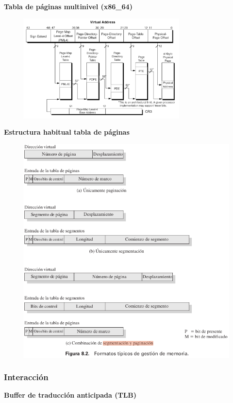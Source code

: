 \documentclass{article}
\begin{document}
\textbf{Tabla de páginas multinivel (x86\_64)}
\begin{figure}[h]
\centering
\includegraphics[scale=1,width=85mm]{tabla_multinivel.png}
\end{figure}

\newpage

\textbf{Estructura habitual tabla de páginas}
\begin{figure}[h]
\centering
\includegraphics[scale=1,width=\textwidth]{estructuratabla.png}
\end{figure}

\subsubsection{Interacción}
\textbf{Buffer de traducción anticipada (TLB)}
\end{document}
